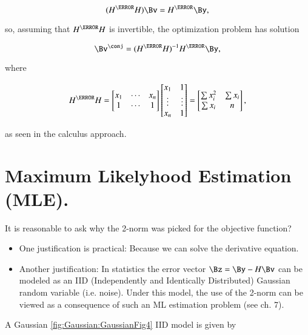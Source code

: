 \begin{dmath}\label{eqn:L1introduction:300}
(H^\T H) \Bv = H^\T \By,
\end{dmath}

so, assuming that \( H^\T H \) is invertible, the optimization problem has solution

\begin{dmath}\label{eqn:L1introduction:320}
\Bv^\conj =
(H^\T H)^{-1} H^\T \By,
\end{dmath}

where

\begin{dmath}\label{eqn:L1introduction:340}
H^\T H
=
\begin{bmatrix}
x_1 & \cdots & x_n \\
 1  & \cdots & 1   \\
\end{bmatrix}
\begin{bmatrix}
x_1 & 1 \\
\vdots & \vdots \\
x_n & 1
\end{bmatrix}
=
\begin{bmatrix}
\sum x_i^2 & \sum x_i \\
\sum x_i & n
\end{bmatrix}
,
\end{dmath}

as seen in the calculus approach.

\section{Maximum Likelyhood Estimation (MLE).}

It is reasonable to ask why the 2-norm was picked for the objective function?

\begin{itemize}
\item One justification is practical: Because we can solve the derivative equation.
\item Another justification: In statistics the error vector \( \Bz = \By - H \Bv \) can be modeled as an IID (Independently and Identically Distributed) Gaussian random variable (i.e. noise).  Under this model, the use of the 2-norm can be viewed as a consequence of such an ML estimation problem (see \citep{boyd2004convex} ch. 7).
\end{itemize}

A Gaussian \cref{fig:Gaussian:GaussianFig4} IID model is given by

